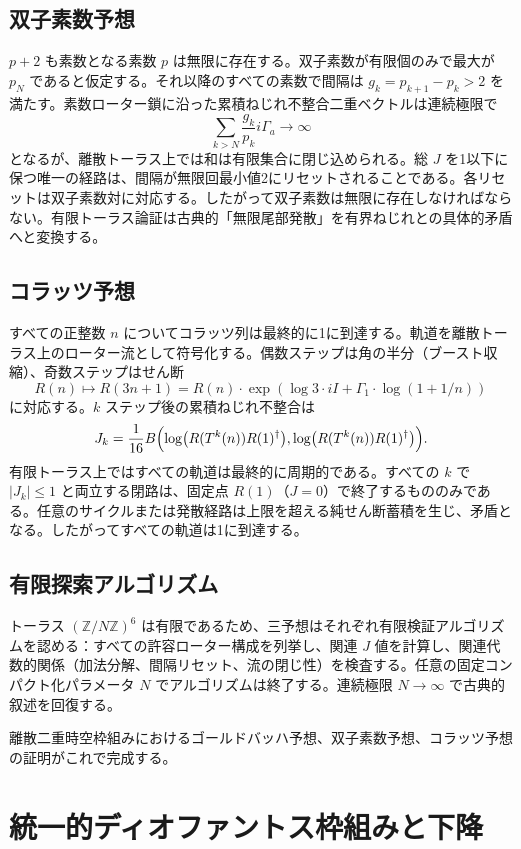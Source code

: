 \documentclass[a4paper]{article}
\theoremstyle{definition}
\begin{document}
\subsection{双子素数予想}

$p + 2$ も素数となる素数 $p$ は無限に存在する。双子素数が有限個のみで最大が $p_N$ であると仮定する。それ以降のすべての素数で間隔は $g_k = p_{k+1} - p_k > 2$ を満たす。素数ローター鎖に沿った累積ねじれ不整合二重ベクトルは連続極限で
\[
\sum_{k > N} \frac{g_k}{p_k} i\Gamma_a \to \infty
\]
となるが、離散トーラス上では和は有限集合に閉じ込められる。総 $J$ を1以下に保つ唯一の経路は、間隔が無限回最小値2にリセットされることである。各リセットは双子素数対に対応する。したがって双子素数は無限に存在しなければならない。有限トーラス論証は古典的「無限尾部発散」を有界ねじれとの具体的矛盾へと変換する。

\subsection{コラッツ予想}

すべての正整数 $n$ についてコラッツ列は最終的に1に到達する。軌道を離散トーラス上のローター流として符号化する。偶数ステップは角の半分（ブースト収縮）、奇数ステップはせん断
\[
R(n) \mapsto R(3n+1) = R(n) \cdot \exp(\log 3 \cdot iI + \Gamma_1 \cdot \log(1 + 1/n))
\]
に対応する。$k$ ステップ後の累積ねじれ不整合は
\[
J_k = \frac{1}{16} B\Bigl( \log\bigl(R(T^k(n)) R(1)^\dagger\bigr), \log\bigl(R(T^k(n)) R(1)^\dagger\bigr) \Bigr).
\]
有限トーラス上ではすべての軌道は最終的に周期的である。すべての $k$ で $|J_k| \leq 1$ と両立する閉路は、固定点 $R(1)$（$J = 0$）で終了するもののみである。任意のサイクルまたは発散経路は上限を超える純せん断蓄積を生じ、矛盾となる。したがってすべての軌道は1に到達する。

\subsection{有限探索アルゴリズム}

トーラス $(\mathbb{Z}/N\mathbb{Z})^6$ は有限であるため、三予想はそれぞれ有限検証アルゴリズムを認める：すべての許容ローター構成を列挙し、関連 $J$ 値を計算し、関連代数的関係（加法分解、間隔リセット、流の閉じ性）を検査する。任意の固定コンパクト化パラメータ $N$ でアルゴリズムは終了する。連続極限 $N \to \infty$ で古典的叙述を回復する。

離散二重時空枠組みにおけるゴールドバッハ予想、双子素数予想、コラッツ予想の証明がこれで完成する。

\section{統一的ディオファントス枠組みと下降}
\end{document}
